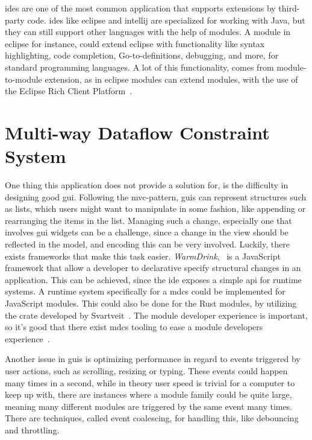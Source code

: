 \gls*{ide}s are one of the most common application that supports extensions by
third-party code. \gls*{ide}s like \gls*{eclipse} and \gls*{intellij} are
specialized for working with Java, but they can still support other languages
with the help of modules. A module in \gls*{eclipse} for instance, could extend
\gls*{eclipse} with functionality like syntax highlighting, code completion,
Go-to-definitions, debugging, and more, for standard programming languages.
A lot of this functionality, comes from module-to-module extension, as in
\gls*{eclipse} modules can extend modules, with the use of the Eclipse Rich
Client Platform~\cite{eclipseRcp}.

\section{Multi-way Dataflow Constraint System} \label{sec:mdcs}

One thing this application does not provide a solution for, is the difficulty
in designing good \gls*{gui}. Following the \gls*{mvc}-pattern, \gls*{gui}s can
represent structures such as lists, which users might want to manipulate in
some fashion, like appending or rearranging the items in the list. Managing such
a change, especially one that involves \gls*{gui} widgets can be a challenge,
since a change in the view should be reflected in the model, and encoding this
can be very involved. Luckily, there exists frameworks that make this task
easier. \textit{WarmDrink},~\cite{warmDrink, dslMdcs} is a JavaScript
framework that allow a developer to declarative specify structural changes in
an application. This can be achieved, since the \gls*{ide} exposes a simple
\gls*{api} for runtime systems. A runtime system specifically for a \gls*{mdcs}
could be implemented for JavaScript modules. This could also be done for the
Rust modules, by utilizing the crate developed by Svartveit~\cite{mcdsRust}.
The module developer experience is important, so it's good that there exist
\gls*{mdcs} tooling to ease a module developers experience~\cite{toolMcds}.

Another issue in \gls*{gui}s is optimizing performance in regard to events
triggered by user actions, such as scrolling, resizing or typing. These events
could happen many times in a second, while in theory user speed is trivial for a
computer to keep up with, there are instances where a module family could be
quite large, meaning many different modules are triggered by the same event many
times. There are techniques, called event coalescing, for handling this, like
debouncing and throttling.

